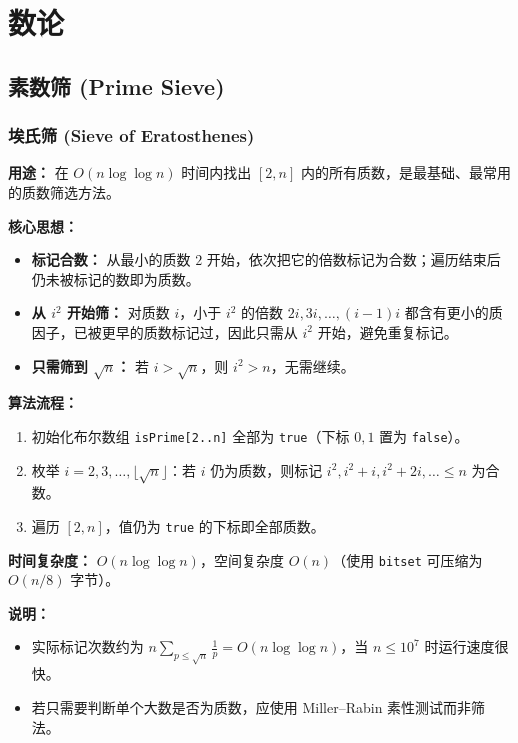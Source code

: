 \section{数论}

\subsection{素数筛 (Prime Sieve)}

\subsubsection{埃氏筛 (Sieve of Eratosthenes)}

\textbf{用途：}
在 $O(n \log \log n)$ 时间内找出 $[2, n]$ 内的所有质数，是最基础、最常用的质数筛选方法。

\textbf{核心思想：}
\begin{itemize}
    \item \textbf{标记合数：} 从最小的质数 $2$ 开始，依次把它的倍数标记为合数；遍历结束后仍未被标记的数即为质数。
    \item \textbf{从 $i^2$ 开始筛：} 对质数 $i$，小于 $i^2$ 的倍数 $2i, 3i, \dots, (i-1)i$ 都含有更小的质因子，已被更早的质数标记过，因此只需从 $i^2$ 开始，避免重复标记。
    \item \textbf{只需筛到 $\sqrt{n}$：} 若 $i > \sqrt{n}$，则 $i^2 > n$，无需继续。
\end{itemize}

\textbf{算法流程：}
\begin{enumerate}
    \item 初始化布尔数组 \texttt{isPrime[2..n]} 全部为 \texttt{true}（下标 $0, 1$ 置为 \texttt{false}）。
    \item 枚举 $i = 2, 3, \dots, \lfloor\sqrt{n}\rfloor$：若 $i$ 仍为质数，则标记 $i^2, i^2+i, i^2+2i, \dots \le n$ 为合数。
    \item 遍历 $[2, n]$，值仍为 \texttt{true} 的下标即全部质数。
\end{enumerate}

\textbf{时间复杂度：} $O(n \log \log n)$，空间复杂度 $O(n)$（使用 \texttt{bitset} 可压缩为 $O(n/8)$ 字节）。



\textbf{说明：}
\begin{itemize}
    \item 实际标记次数约为 $n \sum_{p \le \sqrt{n}} \frac{1}{p} = O(n \log \log n)$，当 $n \le 10^7$ 时运行速度很快。
    \item 若只需要判断单个大数是否为质数，应使用 Miller--Rabin 素性测试而非筛法。
\end{itemize}

